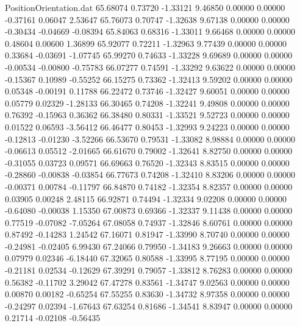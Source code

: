 \begin{filecontents}{PositionOrientation.dat}
  65.68074    0.73720   -1.33121     9.46850    0.00000    0.00000   -0.37161    0.06047    2.53647
  65.76073    0.70747   -1.32638     9.67138    0.00000    0.00000   -0.30434   -0.04669   -0.08394
  65.84063    0.68316   -1.33011     9.66468    0.00000    0.00000    0.48604    0.00600    1.36899
  65.92077    0.72211   -1.32963     9.77439    0.00000    0.00000    0.33684   -0.03691   -1.07745
  65.99270    0.74633   -1.33228     9.69689    0.00000    0.00000   -0.00534   -0.00800   -0.75783
  66.07277    0.74591   -1.33292     9.63622    0.00000    0.00000   -0.15367    0.10989   -0.55252
  66.15275    0.73362   -1.32413     9.59202    0.00000    0.00000    0.05348   -0.00191    0.11788
  66.22472    0.73746   -1.32427     9.60051    0.00000    0.00000    0.05779    0.02329   -1.28133
  66.30465    0.74208   -1.32241     9.49808    0.00000    0.00000    0.76392   -0.15963    0.36362
  66.38480    0.80331   -1.33521     9.52723    0.00000    0.00000    0.01522    0.06593   -3.56412
  66.46477    0.80453   -1.32993     9.24223    0.00000    0.00000   -0.12813   -0.01230   -3.52266
  66.53670    0.79531   -1.33082     8.98884    0.00000    0.00000   -0.06613    0.05512   -2.01665
  66.61670    0.79002   -1.32641     8.82750    0.00000    0.00000   -0.31055    0.03723    0.09571
  66.69663    0.76520   -1.32343     8.83515    0.00000    0.00000   -0.28860   -0.00838   -0.03854
  66.77673    0.74208   -1.32410     8.83206    0.00000    0.00000   -0.00371    0.00784   -0.11797
  66.84870    0.74182   -1.32354     8.82357    0.00000    0.00000    0.03905    0.00248    2.48115
  66.92871    0.74494   -1.32334     9.02208    0.00000    0.00000   -0.64080   -0.00038    1.15350
  67.00873    0.69366   -1.32337     9.11438    0.00000    0.00000    0.77519   -0.07082   -7.05264
  67.08058    0.74937   -1.32846     8.60761    0.00000    0.00000    0.87492   -0.14283    1.24542
  67.16071    0.81947   -1.33990     8.70740    0.00000    0.00000   -0.24981   -0.02405    6.99430
  67.24066    0.79950   -1.34183     9.26663    0.00000    0.00000    0.07979    0.02346   -6.18440
  67.32065    0.80588   -1.33995     8.77195    0.00000    0.00000   -0.21181    0.02534   -0.12629
  67.39291    0.79057   -1.33812     8.76283    0.00000    0.00000    0.56382   -0.11702    3.29042
  67.47278    0.83561   -1.34747     9.02563    0.00000    0.00000    0.00870    0.00182   -0.65254
  67.55255    0.83630   -1.34732     8.97358    0.00000    0.00000   -0.24297    0.02394   -1.67643
  67.63254    0.81686   -1.34541     8.83947    0.00000    0.00000    0.21714   -0.02108   -0.56435

\end{filecontents}
